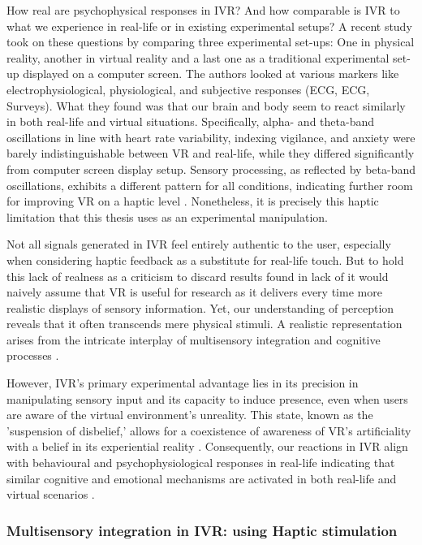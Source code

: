 \documentclass[12pt,oneside,openright]{report}
\begin{document}
How real are psychophysical responses in IVR? And how comparable is IVR to what we experience in real-life or in existing experimental setups? A recent study took on these questions by comparing three experimental set-ups: One in physical reality, another in virtual reality and a last one as a traditional experimental set-up displayed on a computer screen. The authors looked at various markers like electrophysiological, physiological, and subjective responses (ECG, ECG, Surveys). What they found was that our brain and body seem to react similarly in both real-life and virtual situations. Specifically, alpha- and theta-band oscillations in line with heart rate variability, indexing vigilance, and anxiety were barely indistinguishable between VR and real-life, while they differed significantly from computer screen display setup. Sensory processing, as reflected by beta-band oscillations, exhibits a different pattern for all conditions, indicating further room for improving VR on a haptic level \parencite{Schne2023TheRO}. Nonetheless, it is precisely this haptic limitation that this thesis uses as an experimental manipulation. 

Not all signals generated in IVR feel entirely authentic to the user, especially when considering haptic feedback as a substitute for real-life touch. But to hold this lack of realness as a criticism to discard results found in lack of it would naively assume that VR  is useful for research as it delivers every time more realistic displays of sensory information. Yet, our understanding of perception reveals that it often transcends mere physical stimuli. A realistic representation arises from the intricate interplay of multisensory integration and cognitive processes \parencite{deGelder2018VirtualRA}. 

However, IVR's primary experimental advantage lies in its precision in manipulating sensory input and its capacity to induce presence, even when users are aware of the virtual environment's unreality. This state, known as the 'suspension of disbelief,' allows for a coexistence of awareness of VR's artificiality with a belief in its experiential reality \parencite{Slater2009PlaceIA}. Consequently, our reactions in IVR align with behavioural and psychophysiological responses in real-life indicating that similar cognitive and emotional mechanisms are activated in both real-life and virtual scenarios \parencite{Vasser2020GuidelinesFI, deGelder2018VirtualRA}.

\subsubsection*{Multisensory integration in IVR: using Haptic stimulation}
\end{document}
